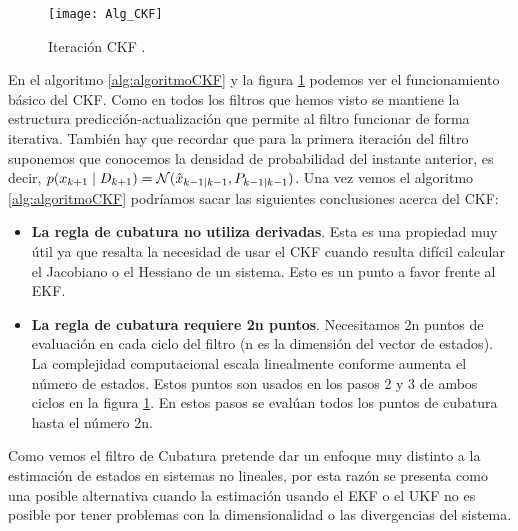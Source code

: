 \begin{figure}[ht!]
\centering
\texttt{[image: Alg\_CKF]}
\caption{Iteración CKF \cite{ienkaran_cubature_2009}.} \label{Iteracion_CKF}
\end{figure}
En el algoritmo \ref{alg:algoritmoCKF} y la figura \ref{Iteracion_CKF} podemos ver el funcionamiento básico del \ac{CKF}.
Como en todos los filtros que hemos visto se mantiene la estructura predicción-actualización que permite al filtro funcionar de forma iterativa.
También hay que recordar que para la primera iteración del filtro suponemos que conocemos la densidad de probabilidad del instante anterior, es decir, $p(x_{k+1}\mid D_{k+1}) = \mathcal{N}(\hat{x}_{k-1\mid k-1},P_{k-1\mid k-1})$.
Una vez vemos el algoritmo \ref{alg:algoritmoCKF} podríamos sacar las siguientes conclusiones acerca del \ac{CKF}:
\begin{itemize}
\item \textbf{La regla de cubatura no utiliza derivadas}. Esta es una propiedad muy útil ya que resalta la necesidad de usar el  \ac{CKF} cuando resulta difícil calcular el Jacobiano o el Hessiano de un sistema.
Esto es un punto a favor frente al \ac{EKF}.
\item \textbf{La regla de cubatura requiere 2n puntos}. Necesitamos 2n puntos de evaluación en cada ciclo del filtro (n es la dimensión del vector de estados).
%
%
%
%
%
%
%
La complejidad computacional escala linealmente conforme aumenta el número de estados.
Estos puntos son usados en los pasos 2 y 3 de ambos ciclos en la figura \ref{Iteracion_CKF}.
En estos pasos se evalúan todos los puntos de cubatura hasta el número 2n.
\end{itemize}
Como vemos el filtro de Cubatura pretende dar un enfoque muy distinto a la estimación de estados en sistemas no lineales, por esta razón se presenta como una posible alternativa cuando la estimación usando el \ac{EKF} o el \ac{UKF} no es posible por tener problemas con la dimensionalidad o las divergencias del sistema.

